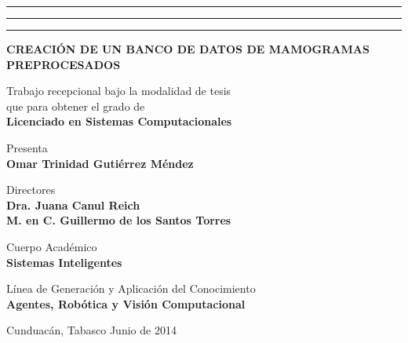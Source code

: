 {{    %
    \begin{minipage}[ht]{0.10\textwidth}
        \flushleft
        \rule{3pt}{20cm}
        \rule{4pt}{20cm}
        \rule{3pt}{20cm}
    \end{minipage}
    \begin{minipage}[th]{0.89\textwidth}
    \centering
    {\bfseries{\Large CREACIÓN DE UN BANCO DE DATOS DE MAMOGRAMAS
    PREPROCESADOS}}
    \vspace*{2\baselineskip} \vfill

    Trabajo recepcional bajo la modalidad de tesis \\
    que para obtener el grado de\\[\baselineskip]

    {\bfseries{\Large Licenciado en Sistemas Computacionales}}\\
    \vspace*{2\baselineskip} \vfill

    Presenta\\[\baselineskip]

    {\bfseries{\Large Omar Trinidad Gutiérrez Méndez}}\\
    \vspace*{2\baselineskip} \vfill

    Directores\\[\baselineskip]

    {\bfseries{\Large Dra. Juana Canul Reich}}\\
    {\bfseries{\Large M. en C. Guillermo de los Santos Torres}}\\
    \vspace*{2\baselineskip} \vfill

    Cuerpo Académico\\[\baselineskip]

    {\bfseries{\Large Sistemas Inteligentes}}\\
    \vspace*{2\baselineskip} \vfill

    Línea de Generación y Aplicación del Conocimiento\\[\baselineskip]

    {\bfseries{\Large Agentes, Robótica y Visión Computacional}}\\
    \vspace*{2\baselineskip} \vfill

    Cunduacán, Tabasco \hfill Junio de 2014

    \end{minipage}
} %

}
